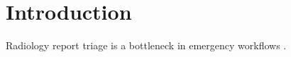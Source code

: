 \section{Introduction}
Radiology report triage is a bottleneck in emergency workflows \cite{smith2019}.
